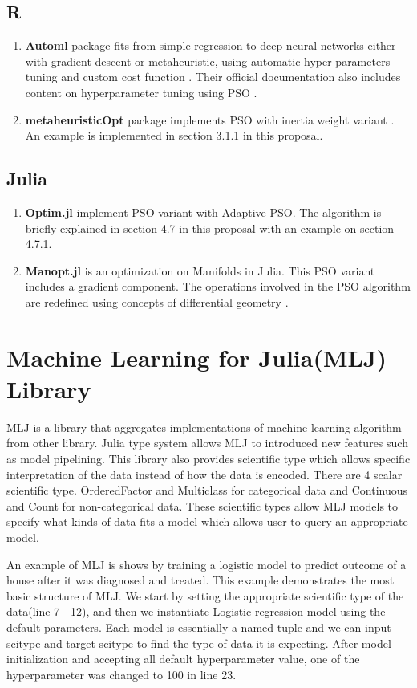 \documentclass{article}
\begin{document}
\subsection{R}
\begin{enumerate}
    \item \textbf{Automl} package fits from simple regression to  deep neural networks either with gradient descent or metaheuristic, using automatic hyper parameters tuning and custom cost function \cite{automl}. Their official documentation also includes content on hyperparameter tuning using PSO \cite{automlpso}.
    \item \textbf{metaheuristicOpt} package implements PSO with inertia weight variant \cite{metaheuristicOpt}. An example is implemented in section 3.1.1  in this proposal.
\end{enumerate}

\subsection{Julia}
\begin{enumerate}
    \item \textbf{Optim.jl} implement PSO variant with Adaptive PSO. The algorithm is briefly explained in section 4.7 in this proposal with an example on section 4.7.1.
    \item \textbf{Manopt.jl} is an optimization on Manifolds in Julia. This PSO variant includes a gradient component. The operations involved in the PSO algorithm are redefined using concepts of differential geometry \cite{10.1007/978-3-642-15461-4_2}.
\end{enumerate}

\section{Machine Learning for Julia(MLJ) Library}
MLJ is a library that aggregates implementations of machine learning algorithm from other library. Julia type system allows MLJ to introduced new features such as model pipelining. This library also provides scientific type which allows specific interpretation of the data instead of how the data is encoded. There are 4 scalar scientific type. OrderedFactor and Multiclass for categorical data and Continuous and Count for non-categorical data. These scientific types allow MLJ models to specify what kinds of data fits a model which allows user to query an appropriate model.

An example of MLJ is shows by training a logistic model to predict outcome of a house after it was diagnosed and treated. This example demonstrates the most basic structure of MLJ. We start by setting the appropriate scientific type of the data(line 7 - 12), and then we instantiate Logistic regression model using the default parameters. Each model is essentially a named tuple and we can input scitype and target scitype to find the type of data it is expecting. After model initialization and accepting all default hyperparameter value, one of the hyperparameter was changed to 100 in line 23.
\end{document}
